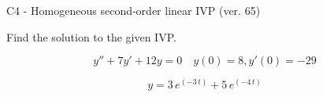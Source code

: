 \begin{exercise}
  \begin{exerciseTitle}C4 - Homogeneous second-order linear IVP (ver. 65)\end{exerciseTitle}
  \begin{exerciseStatement}
    
Find the solution to the given IVP.

    
\[y''+7y'+12y = 0 \hspace{1em} y(0) = 8 , y'(0) = -29\]

  \end{exerciseStatement}
  \begin{exerciseAnswer}
    
\[y= 3 \, e^{\left(-3 \, t\right)} + 5 \, e^{\left(-4 \, t\right)}\]

  \end{exerciseAnswer}
\end{exercise}